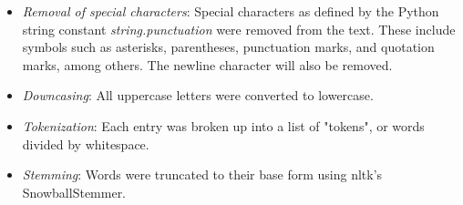 \documentclass{icsthesis}
\begin{document}
\begin{mainmatter}
                \begin{itemize}
                    \item{\emph{Removal of special characters}: Special characters as defined by the Python string constant \emph{string.punctuation} were removed from the text. These include symbols such as asterisks, parentheses, punctuation marks, and quotation marks, among others. The newline character will also be removed.}
                    \item{\emph{Downcasing}: All uppercase letters were converted to lowercase.}
                    \item {\emph{Tokenization}: Each entry was broken up into a list of "tokens", or words divided by whitespace.}
                    \item{\emph{Stemming}: Words were truncated to their base form using nltk's SnowballStemmer.}
                \end{itemize}
                

\end{mainmatter}
\end{document}
